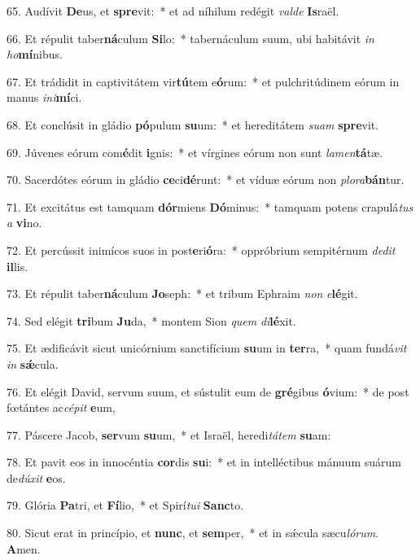 65. Audívit \textbf{De}us, et \textbf{spre}vit:~*  et ad níhilum redégit \textit{val}\textit{de} \textbf{Is}raël.\

66. Et répulit taber\textbf{ná}culum \textbf{Si}lo:~*  tabernáculum suum, ubi habitávit \textit{in} \textit{ho}\textbf{mí}nibus.\

67. Et trádidit in captivitátem vir\textbf{tú}tem e\textbf{ó}rum:~*  et pulchritúdinem eórum in manus \textit{in}\textit{i}\textbf{mí}ci.\

68. Et conclúsit in gládio \textbf{pó}pulum \textbf{su}um:~*  et hereditátem \textit{su}\textit{am} \textbf{spre}vit.\

69. Júvenes eórum com\textbf{é}dit \textbf{i}gnis:~*  et vírgines eórum non sunt \textit{la}\textit{men}\textbf{tá}tæ.\

70. Sacerdótes eórum in gládio \textbf{ce}ci\textbf{dé}runt:~*  et víduæ eórum non \textit{plo}\textit{ra}\textbf{bán}tur.\

71. Et excitátus est tamquam \textbf{dór}miens \textbf{Dó}minus:~*  tamquam potens crapulá\textit{tus} \textit{a} \textbf{vi}no.\

72. Et percússit inimícos suos in post\textbf{e}ri\textbf{ó}ra:~*  oppróbrium sempitérnum \textit{de}\textit{dit} \textbf{il}lis.\

73. Et répulit taber\textbf{ná}culum \textbf{Jo}seph:~*  et tribum Ephraim \textit{non} \textit{e}\textbf{lé}git.\

74. Sed elégit \textbf{tri}bum \textbf{Ju}da,~*  montem Sion \textit{quem} \textit{di}\textbf{lé}xit.\

75. Et ædificávit sicut unicórnium sanctifícium \textbf{su}um in \textbf{ter}ra,~*  quam fundá\textit{vit} \textit{in} \textbf{sǽ}cula.\

76. Et elégit David, servum suum, et sústulit eum de \textbf{gré}gibus \textbf{ó}vium:~*  de post fœtántes ac\textit{cé}\textit{pit} \textbf{e}um,\

77. Páscere Jacob, \textbf{ser}vum \textbf{su}um,~*  et Israël, heredi\textit{tá}\textit{tem} \textbf{su}am:\

78. Et pavit eos in innocéntia \textbf{cor}dis \textbf{su}i:~*  et in intelléctibus mánuum suárum de\textit{dú}\textit{xit} \textbf{e}os.\

79. Glória \textbf{Pa}tri, et \textbf{Fí}lio,~*  et Spirí\textit{tu}\textit{i} \textbf{Sanc}to.\

80. Sicut erat in princípio, et \textbf{nunc}, et \textbf{sem}per,~*  et in sǽcula sæcu\textit{ló}\textit{rum}. \textbf{A}men.\

